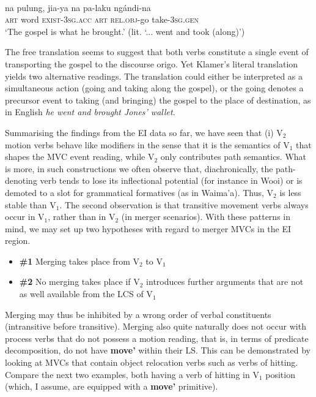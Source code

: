 \ea
{}\\
\gll na pulung, jia-ya na pa-laku ngándi-na \\
\textsc{art} word \textsc{exist}-3\textsc{sg}.\textsc{acc} \textsc{art} \textsc{rel}.\textsc{obj}-go take-3\textsc{sg}.\textsc{gen} \\
\glft `The gospel is what he brought.' (lit. `... went and took (along)') \\
\z

The free translation seems to suggest that both verbs constitute a single event of transporting the gospel to the discourse origo. Yet Klamer's literal translation yields two alternative readings. The translation could either be interpreted as a simultaneous action (going and taking along the gospel), or the going denotes a precursor event to taking (and bringing) the gospel to the place of destination, as in English \textit{he went and brought Jones' wallet}.

Summarising the findings from the EI data so far, we have seen that (i) V$_2$ motion verbs behave like modifiers in the sense that it is the semantics of V$_1$ that shapes the MVC event reading, while V$_2$ only contributes path semantics. What is more, in such constructions we often observe that, diachronically, the path-denoting verb tends to lose its inflectional potential (for instance in Wooi) or is demoted to a slot for grammatical formatives (as in Waima'a). Thus, V$_2$ is less stable than V$_1$. The second observation is that transitive movement verbs always occur in V$_1$, rather than in V$_2$ (in merger scenarios). With these patterns in mind, we may set up two hypotheses with regard to merger MVCs in the EI region.

\begin{itemize}
\item \textbf{\#1} Merging takes place from V$_2$ to V$_1$
\item \textbf{\#2} No merging takes place if V$_2$ introduces further arguments that are not as well available from the LCS of V$_1$
\end{itemize}

Merging may thus be inhibited by a wrong order of verbal constituents (intransitive before transitive). Merging also quite naturally does not occur with process verbs that do not possess a motion reading, that is, in terms of predicate decomposition, do not have \textbf{move'} within their LS. This can be demonstrated by looking at MVCs that contain object relocation verbs such as verbs of hitting. Compare the next two examples, both having a verb of hitting in V$_1$ position (which, I assume, are equipped with a \textbf{move'} primitive).

